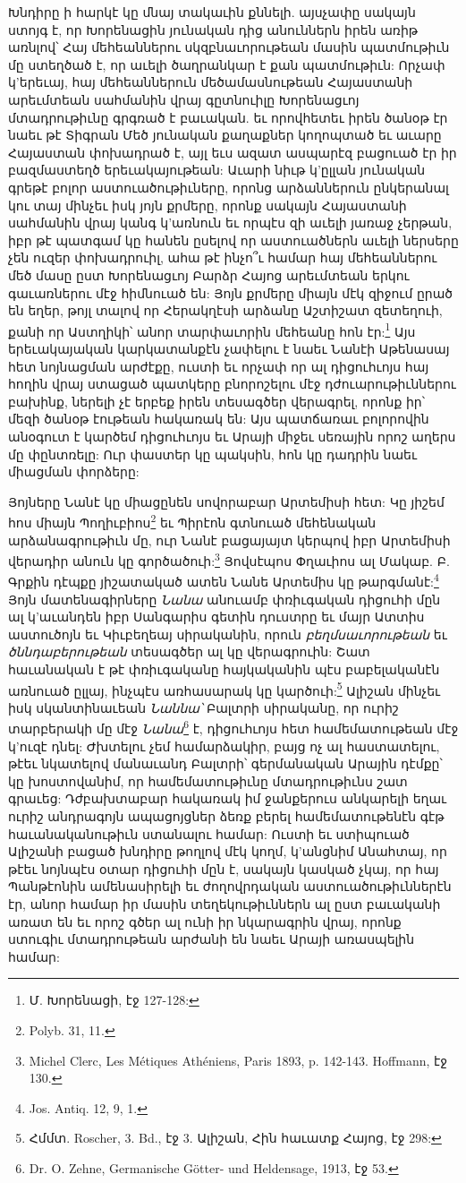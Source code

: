 \documentclass{article}
\begin{document}
{Խնդիրը ի հարկէ կը մնայ տակաւին քննելի. այսչափը սակայն ստոյգ է, որ Խորենացին յունական դից անուններն իրեն առիթ առնլով՝ Հայ մեհեաններու սկզբնաւորութեան մասին պատմութիւն մը ստեղծած է, որ աւելի ծաղրանկար է քան պատմութիւն: Որչափ կ'երեւայ, հայ մեհեաններուն մեծամասնութեան Հայաստանի արեւմտեան սահմանին վրայ գըտնուիլը Խորենացւոյ մտադրութիւնը գրգռած է բաւական. եւ որովհետեւ իրեն ծանօթ էր նաեւ թէ Տիգրան Մեծ յունական քաղաքներ կողոպտած եւ աւարը Հայաստան փոխադրած է, այլ եւս ազատ ասպարէզ բացուած էր իր բազմաստեղծ երեւակայութեան: Աւարի նիւթ կ'ըլլան յունական գրեթէ բոլոր աստուածութիւները, որոնց արձաններուն ընկերանալ կու տայ մինչեւ իսկ յոյն քրմերը, որոնք սակայն Հայաստանի սահմանին վրայ կանգ կ'առնուն եւ որպէս զի աւելի յառաջ չերթան, իբր թէ պատգամ կը հանեն ըսելով որ աստուածներն աւելի ներսերը չեն ուզեր փոխադրուիլ, ահա թէ ինչո՞ւ համար հայ մեհեաններու մեծ մասը ըստ Խորենացւոյ Բարձր Հայոց արեւմտեան երկու գաւառներու մէջ հիմնուած են: Յոյն քրմերը միայն մէկ զիջում ըրած են եղեր, թոյլ տալով որ Հերակղէսի արձանը Աշտիշատ զետեղուի, քանի որ Աստղիկի՝ անոր տարփաւորին մեհեանը հոն էր:\footnote{Մ. Խորենացի, էջ 127-128:} Այս երեւակայական կարկատանքէն չափելու է նաեւ Նանէի Աթենասայ հետ նոյնացման արժէքը, ուստի եւ որչափ որ ալ դիցուհւոյս հայ հողին վրայ ստացած պատկերը բնորոշելու մէջ դժուարութիւններու բախինք, ներելի չէ երբեք իրեն տեսագծեր վերագրել, որոնք իր՝ մեզի ծանօթ էութեան հակառակ են: Այս պատճառաւ բոլորովին անօգուտ է կարծեմ դիցուհւոյս եւ Արայի միջեւ սեռային որոշ աղերս մը փընտռելը: Ուր փաստեր կը պակսին, հոն կը դադրին նաեւ միացման փորձերը:

Յոյները Նանէ կը միացընեն սովորաբար Արտեմիսի հետ: Կը յիշեմ հոս միայն Պողիւբիոս\footnote{Polyb. 31, 11.} եւ Պիրէոն գտնուած մեհենական արձանագրութիւն մը, ուր Նանէ բացայայտ կերպով իբր Արտեմիսի վերադիր անուն կը գործածուի:\footnote{Michel Clerc, Les Métiques Athéniens, Paris 1893, p. 142-143. Hoffmann, էջ 130.} Յովսէպոս Փղաւիոս ալ Մակաբ. Բ. Գրքին դէպքը յիշատակած ատեն Նանե Արտեմիս կը թարգմանէ:\footnote{Jos. Antiq. 12, 9, 1.} Յոյն մատենագիրները \emph{Նանա} անուամբ փռիւգական դիցուհի մըն ալ կ'աւանդեն իբր Սանգարիս գետին դուստրը եւ մայր Ատտիս աստուծոյն եւ Կիւբեղեայ սիրականին, որուն \emph{բեղմսաւորութեան} եւ \emph{ծննդաբերութեան} տեսագծեր ալ կը վերագրուին: Շատ հաւանական է թէ փռիւգականը հայկականին պէս բաբելականէն առնուած ըլլայ, ինչպէս առհասարակ կը կարծուի:\footnote{Հմմտ. Roscher, 3. Bd., էջ 3. Ալիշան, Հին հաւատք Հայոց, էջ 298:} Ալիշան մինչեւ իսկ սկանտինաւեան \emph{Նաննա՝} Բալտրի սիրականը, որ ուրիշ տարբերակի մը մէջ \emph{Նանա}\footnote{Dr. O. Zehne, Germanische Götter- und Heldensage, 1913, էջ 53.} է, դիցուհւոյս հետ համեմատութեան մէջ կ'ուզէ դնել: Ժխտելու չեմ համարձակիր, բայց ոչ ալ հաստատելու, թէեւ նկատելով մանաւանդ Բալտրի՝ գերմանական Արային դէմքը՝ կը խոստովանիմ, որ համեմատութիւնը մտադրութիւնս շատ գրաւեց: Դժբախտաբար հակառակ իմ ջանքերուս անկարելի եղաւ ուրիշ անդրագոյն ապացոյցներ ձեռք բերել համեմատութենէն գէթ հաւանականութիւն ստանալու համար: Ուստի եւ ստիպուած Ալիշանի բացած խնդիրը թողլով մէկ կողմ, կ'անցնիմ Անահտայ, որ թէեւ նոյնպէս օտար դիցուհի մըն է, սակայն կասկած չկայ, որ հայ Պանթէոնին ամենասիրելի եւ ժողովրդական աստուածութիւններէն էր, անոր համար իր մասին տեղեկութիւններն ալ ըստ բաւականի առատ են եւ որոշ գծեր ալ ունի իր նկարագրին վրայ, որոնք ստուգիւ մտադրութեան արժանի են նաեւ Արայի առասպելին համար:

}
\end{document}
